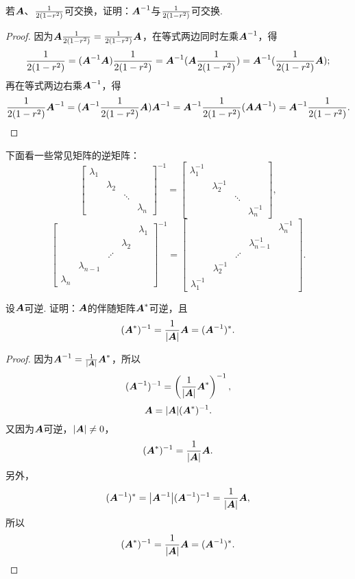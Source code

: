 \begin{example}
若\(\A\)、\(\B\)可交换，证明：\(\A^{-1}\)与\(\B\)可交换.
\begin{proof}
因为\(\A\B = \B\A\)，在等式两边同时左乘\(\A^{-1}\)，得\[
\B = (\A^{-1}\A)\B = \A^{-1}(\A\B) = \A^{-1}(\B\A);
\]再在等式两边右乘\(\A^{-1}\)，得\[
\B\A^{-1} = (\A^{-1}\B\A)\A^{-1} = \A^{-1}\B(\A\A^{-1}) = \A^{-1}\B.
\qedhere
\]
\end{proof}
\end{example}

\begin{example}
下面看一些常见矩阵的逆矩阵：
\[
\begin{bmatrix}
\lambda_1 \\
& \lambda_2 \\
&& \ddots \\
&&& \lambda_n
\end{bmatrix}^{-1}
= \begin{bmatrix}
\lambda_1^{-1} \\
& \lambda_2^{-1} \\
&& \ddots \\
&&& \lambda_n^{-1}
\end{bmatrix},
\]\[
\begin{bmatrix}
& & & & \lambda_1 \\
& & & \lambda_2 \\
& & \iddots \\
& \lambda_{n-1} \\
\lambda_n
\end{bmatrix}^{-1}
= \begin{bmatrix}
& & & & \lambda_n^{-1} \\
& & & \lambda_{n-1}^{-1} \\
& & \iddots \\
& \lambda_2^{-1} \\
\lambda_1^{-1}
\end{bmatrix}.
\]
\end{example}

\begin{example}
设\(\A\)可逆.
证明：\(\A\)的伴随矩阵\(\A^*\)可逆，且\[
(\A^*)^{-1}=\frac{1}{\abs{\A}}\A=(\A^{-1})^*.
\]
\begin{proof}
因为\(\A^{-1}=\frac{1}{\abs{\A}} \A^*\)，所以\[
(\A^{-1})^{-1} = \left( \frac{1}{\abs{\A}} \A^* \right)^{-1},
\]\[
\A = \abs{\A} (\A^*)^{-1}.
\]又因为\(\A\)可逆，\(\abs{\A}\neq0\)，\[
(\A^*)^{-1} = \frac{1}{\abs{\A}} \A.
\]另外，\[
(\A^{-1})^* = \abs{\A^{-1}} (\A^{-1})^{-1}
= \frac{1}{\abs{\A}} \A,
\]所以\[
(\A^*)^{-1}=\frac{1}{\abs{\A}}\A=(\A^{-1})^*.
\qedhere
\]
\end{proof}
\end{example}

